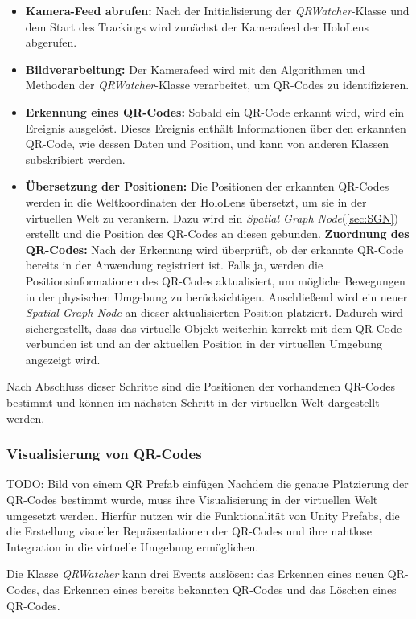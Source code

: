 \begin{itemize}
\item \textbf{Kamera-Feed abrufen:} Nach der Initialisierung der \textit{QRWatcher}-Klasse und dem Start des Trackings wird zunächst der Kamerafeed der HoloLens abgerufen.
\item \textbf{Bildverarbeitung:} Der Kamerafeed wird mit den Algorithmen und Methoden der \textit{QRWatcher}-Klasse verarbeitet, um QR-Codes zu identifizieren.
\item \textbf{Erkennung eines QR-Codes:} Sobald ein QR-Code erkannt wird, wird ein Ereignis ausgelöst. Dieses Ereignis enthält Informationen über den erkannten QR-Code, wie dessen Daten und Position, und kann von anderen Klassen subskribiert werden.
\item \textbf{Übersetzung der Positionen:} Die Positionen der erkannten QR-Codes werden in die Weltkoordinaten der HoloLens übersetzt, um sie in der virtuellen Welt zu verankern. Dazu wird ein \textit{Spatial Graph Node}(\ref{sec:SGN}) erstellt und die Position des QR-Codes an diesen gebunden.
\textbf{Zuordnung des QR-Codes:} Nach der Erkennung wird überprüft, ob der erkannte QR-Code bereits in der Anwendung registriert ist. Falls ja, werden die Positionsinformationen des QR-Codes aktualisiert, um mögliche Bewegungen in der physischen Umgebung zu berücksichtigen. Anschließend wird ein neuer \textit{Spatial Graph Node} an dieser aktualisierten Position platziert. Dadurch wird sichergestellt, dass das virtuelle Objekt weiterhin korrekt mit dem QR-Code verbunden ist und an der aktuellen Position in der virtuellen Umgebung angezeigt wird.
\end{itemize}

Nach Abschluss dieser Schritte sind die Positionen der vorhandenen QR-Codes bestimmt und können im nächsten Schritt in der virtuellen Welt dargestellt werden.

\subsubsection{Visualisierung von QR-Codes}
TODO: Bild von einem QR Prefab einfügen
Nachdem die genaue Platzierung der QR-Codes bestimmt wurde, muss ihre Visualisierung in der virtuellen Welt umgesetzt werden. Hierfür nutzen wir die Funktionalität von Unity Prefabs, die die Erstellung visueller Repräsentationen der QR-Codes und ihre nahtlose Integration in die virtuelle Umgebung ermöglichen.

Die Klasse \textit{QRWatcher} kann drei Events auslösen: das Erkennen eines neuen QR-Codes, das Erkennen eines bereits bekannten QR-Codes und das Löschen eines QR-Codes.

